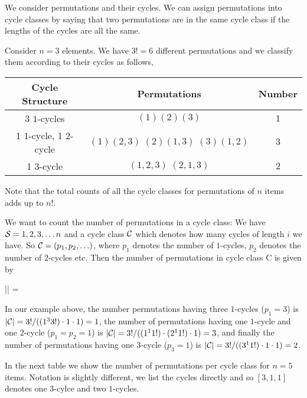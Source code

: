 
We consider permutations and their cycles. We can assign permutations into cycle classes by saying that two permutations are in the same cycle class if the lengths of the cycles are all the same. 

Consider $n = 3$ elements. We have $3! = 6$ different permutations and we classify them according to their cycles as follows,

\vspace{2mm}

\begin{tabular}{|c|c|c|}
  Cycle Structure & Permutations & Number \\ \hline
  3 $1$-cycles & $(1)(2)(3)$ & $1$ \\
  1 $1$-cycle, 1 $2$-cycle & $(1)(2,3) \; (2)(1,3) \; (3)(1,2)$ & $3$ \\
  1 $3$-cycle & $(1,2,3) \; (2,1,3)$ & $2$
\end{tabular}

\vspace{2mm}

Note that the total counts of all the cycle classes for permutations of $n$ items adds up to $n!$.

We want to count the number of permutations in a cycle class: We have $\mathcal{S} = 1,2,3,\ldots n$ and a cycle class $\mathcal{C}$ which denotes how many cycles of length $i$ we have. So $\mathcal{C} = (p_1, p_2, \ldots )$, where $p_1$ denotes the number of $1$-cycles,  $p_2$ denotes the number of $2$-cycles etc. Then the number of permutations in cycle class C is given by

\bee
|\Cc| = 
\eee

In our example above, the number permutations having three $1$-cycles ($p_1 = 3$) is $|\mathcal{C}| = 3! / ((1^3 3!) \cdot 1 \cdot 1) = 1$, the number of permutations having one $1$-cycle and one $2$-cycle ($p_1 = p_2 = 1$) is $|\mathcal{C}| = 3! / ((1^1 1!) \cdot (2^1 1!) \cdot 1) = 3$, and finally the number of permutations having one $3$-cycle ($p_3 = 1$) is $|\mathcal{C}| = 3! / ((3^1 1!) \cdot 1 \cdot 1) = 2$.

In the next table we show the number of permutations per cycle class for $n=5$ items. Notation is slightly different, we list the cycles directly and so $[3,1,1]$ denotes one $3$-cylce and two $1$-cycles.

\vspace{2mm}

